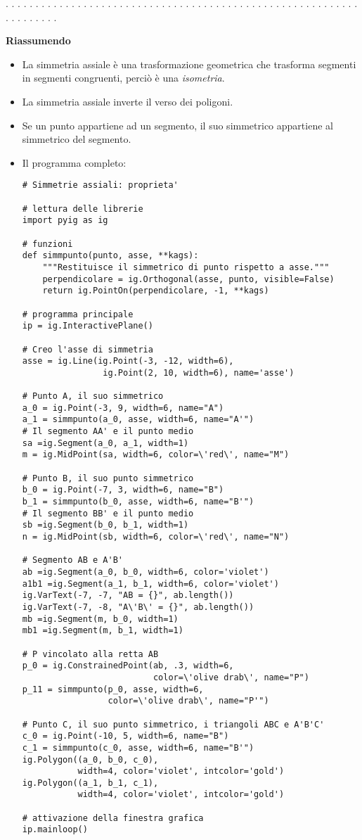 . . . . . . . . . . . . . . . . . . . . . . . . . . . . . . . . . . . . . . . .
. . . . . . . . . . . . . . . . . . . . . . . . . . . .

\textbf{Riassumendo}
\begin{itemize} [noitemsep]
\item La simmetria assiale è una trasformazione geometrica che trasforma 
segmenti
in segmenti congruenti, perciò è una \emph{isometria}.
\item La simmetria assiale inverte il verso dei poligoni.
\item Se un punto appartiene ad un segmento, il suo simmetrico appartiene al
simmetrico del segmento.
\item Il programma completo:

\begin{lstlisting}
# Simmetrie assiali: proprieta'

# lettura delle librerie
import pyig as ig

# funzioni
def simmpunto(punto, asse, **kags):
    """Restituisce il simmetrico di punto rispetto a asse."""
    perpendicolare = ig.Orthogonal(asse, punto, visible=False)
    return ig.PointOn(perpendicolare, -1, **kags)

# programma principale
ip = ig.InteractivePlane()

# Creo l'asse di simmetria
asse = ig.Line(ig.Point(-3, -12, width=6),
                ig.Point(2, 10, width=6), name='asse')

# Punto A, il suo simmetrico
a_0 = ig.Point(-3, 9, width=6, name="A")
a_1 = simmpunto(a_0, asse, width=6, name="A'")
# Il segmento AA' e il punto medio
sa =ig.Segment(a_0, a_1, width=1)
m = ig.MidPoint(sa, width=6, color=\'red\', name="M")

# Punto B, il suo punto simmetrico
b_0 = ig.Point(-7, 3, width=6, name="B")
b_1 = simmpunto(b_0, asse, width=6, name="B'")
# Il segmento BB' e il punto medio
sb =ig.Segment(b_0, b_1, width=1)
n = ig.MidPoint(sb, width=6, color=\'red\', name="N")

# Segmento AB e A'B'
ab =ig.Segment(a_0, b_0, width=6, color='violet')
a1b1 =ig.Segment(a_1, b_1, width=6, color='violet')
ig.VarText(-7, -7, "AB = {}", ab.length())
ig.VarText(-7, -8, "A\'B\' = {}", ab.length())
mb =ig.Segment(m, b_0, width=1)
mb1 =ig.Segment(m, b_1, width=1)

# P vincolato alla retta AB
p_0 = ig.ConstrainedPoint(ab, .3, width=6, 
                          color=\'olive drab\', name="P")
p_11 = simmpunto(p_0, asse, width=6, 
                 color=\'olive drab\', name="P'")

# Punto C, il suo punto simmetrico, i triangoli ABC e A'B'C'
c_0 = ig.Point(-10, 5, width=6, name="B")
c_1 = simmpunto(c_0, asse, width=6, name="B'")
ig.Polygon((a_0, b_0, c_0), 
           width=4, color='violet', intcolor='gold')
ig.Polygon((a_1, b_1, c_1), 
           width=4, color='violet', intcolor='gold')

# attivazione della finestra grafica
ip.mainloop()
\end{lstlisting}

\end{itemize}


